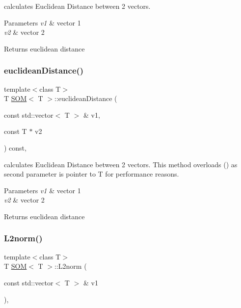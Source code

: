 calculates Euclidean Distance between 2 vectors. 


\begin{DoxyParams}{Parameters}
{\em v1} & vector 1\\
\hline
{\em v2} & vector 2\\
\hline
\end{DoxyParams}
\begin{DoxyReturn}{Returns}
euclidean distance
\end{DoxyReturn}
\mbox{\label{class_s_o_m_a1bdfadf3e4dbd2a9cb229e72cf52fb0b}} 
\subsubsection{\texorpdfstring{euclidean\+Distance()}{euclideanDistance()}\hspace{0.1cm}{\footnotesize\ttfamily [2/2]}}
{\footnotesize\ttfamily template$<$class T$>$ \\
T \mbox{\hyperlink{class_s_o_m}{S\+OM}}$<$ T $>$\+::euclidean\+Distance (\begin{DoxyParamCaption}\item[{const std\+::vector$<$ T $>$ \&}]{v1,  }\item[{const T $\ast$}]{v2 }\end{DoxyParamCaption}) const\hspace{0.3cm}{\ttfamily [inline]}, {\ttfamily [private]}}



calculates Euclidean Distance between 2 vectors. This method overloads () as second parameter is pointer to T for performance reasons. 


\begin{DoxyParams}{Parameters}
{\em v1} & vector 1\\
\hline
{\em v2} & vector 2\\
\hline
\end{DoxyParams}
\begin{DoxyReturn}{Returns}
euclidean distance
\end{DoxyReturn}
\mbox{\label{class_s_o_m_a9dbf0a67e0afcc612ff68a7f287c8450}} 
\subsubsection{\texorpdfstring{L2norm()}{L2norm()}}
{\footnotesize\ttfamily template$<$class T$>$ \\
T \mbox{\hyperlink{class_s_o_m}{S\+OM}}$<$ T $>$\+::L2norm (\begin{DoxyParamCaption}\item[{const std\+::vector$<$ T $>$ \&}]{v1 }\end{DoxyParamCaption})\hspace{0.3cm}{\ttfamily [inline]}, {\ttfamily [private]}}



